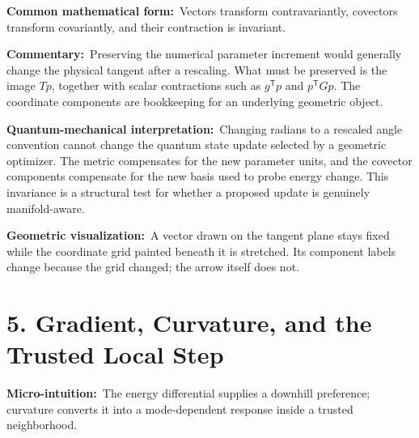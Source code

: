 \documentclass[10pt,twocolumn]{article}
\newcommand{\micro}[1]{\par\noindent\textbf{Micro-intuition:}\ #1\par}
\newcommand{\form}[1]{\par\noindent\textbf{Common mathematical form:}\ #1\par}
\newcommand{\commentary}[1]{\par\noindent\textbf{Commentary:}\ #1\par}
\newcommand{\phys}[1]{\par\noindent\textbf{Quantum-mechanical interpretation:}\ #1\par}
\newcommand{\geom}[1]{\par\noindent\textbf{Geometric visualization:}\ \textcolor{teal!70!black}{#1}\par}
\newcommand{\conceptbreak}{\par\medskip\noindent{\color{black!30}\rule{\columnwidth}{0.35pt}}\par\medskip}
\begin{document}
\form{Vectors transform contravariantly, covectors transform covariantly, and
their contraction is invariant.}

\commentary{Preserving the numerical parameter increment would generally
change the physical tangent after a rescaling. What must be preserved is the
image \(T p\), together with scalar contractions such as \(g^{\mathsf T}p\)
and \(p^{\mathsf T}Gp\). The coordinate components are bookkeeping for an
underlying geometric object.}

\phys{Changing radians to a rescaled angle convention cannot change the quantum
state update selected by a geometric optimizer. The metric compensates for the
new parameter units, and the covector components compensate for the new basis
used to probe energy change. This invariance is a structural test for whether a
proposed update is genuinely manifold-aware.}

\geom{A vector drawn on the tangent plane stays fixed while the coordinate grid
painted beneath it is stretched. Its component labels change because the grid
changed; the arrow itself does not.}

\conceptbreak

\section*{5. Gradient, Curvature, and the Trusted Local Step}

\micro{The energy differential supplies a downhill preference; curvature
converts it into a mode-dependent response inside a trusted neighborhood.}
\end{document}
